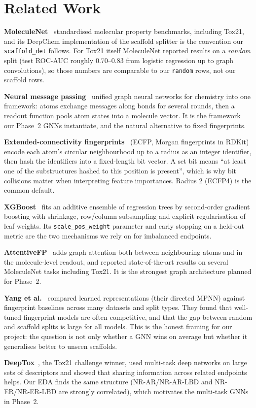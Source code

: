 \section{Related Work}

\textbf{MoleculeNet}~\cite{wu2018moleculenet} standardised molecular property benchmarks, including Tox21, and its DeepChem implementation of the scaffold splitter is the convention our \texttt{scaffold\_det} follows. For Tox21 itself MoleculeNet reported results on a \emph{random} split (test ROC-AUC roughly 0.70--0.83 from logistic regression up to graph convolutions), so those numbers are comparable to our \texttt{random} rows, not our scaffold rows.

\textbf{Neural message passing}~\cite{gilmer2017mpnn} unified graph neural networks for chemistry into one framework: atoms exchange messages along bonds for several rounds, then a readout function pools atom states into a molecule vector. It is the framework our Phase~2 GNNs instantiate, and the natural alternative to fixed fingerprints.

\textbf{Extended-connectivity fingerprints}~\cite{rogers2010ecfp} (ECFP, Morgan fingerprints in RDKit) encode each atom's circular neighbourhood up to a radius as an integer identifier, then hash the identifiers into a fixed-length bit vector. A set bit means ``at least one of the substructures hashed to this position is present'', which is why bit collisions matter when interpreting feature importances. Radius 2 (ECFP4) is the common default.

\textbf{XGBoost}~\cite{chen2016xgboost} fits an additive ensemble of regression trees by second-order gradient boosting with shrinkage, row/column subsampling and explicit regularisation of leaf weights. Its \texttt{scale\_pos\_weight} parameter and early stopping on a held-out metric are the two mechanisms we rely on for imbalanced endpoints.

\textbf{AttentiveFP}~\cite{xiong2020attentivefp} adds graph attention both between neighbouring atoms and in the molecule-level readout, and reported state-of-the-art results on several MoleculeNet tasks including Tox21. It is the strongest graph architecture planned for Phase~2.

\textbf{Yang et al.}~\cite{yang2019analyzing} compared learned representations (their directed MPNN) against fingerprint baselines across many datasets and split types. They found that well-tuned fingerprint models are often competitive, and that the gap between random and scaffold splits is large for all models. This is the honest framing for our project: the question is not only whether a GNN wins on average but whether it generalises better to unseen scaffolds.

\textbf{DeepTox}~\cite{mayr2016deeptox}, the Tox21 challenge winner, used multi-task deep networks on large sets of descriptors and showed that sharing information across related endpoints helps. Our EDA finds the same structure (NR-AR/NR-AR-LBD and NR-ER/NR-ER-LBD are strongly correlated), which motivates the multi-task GNNs in Phase~2.
